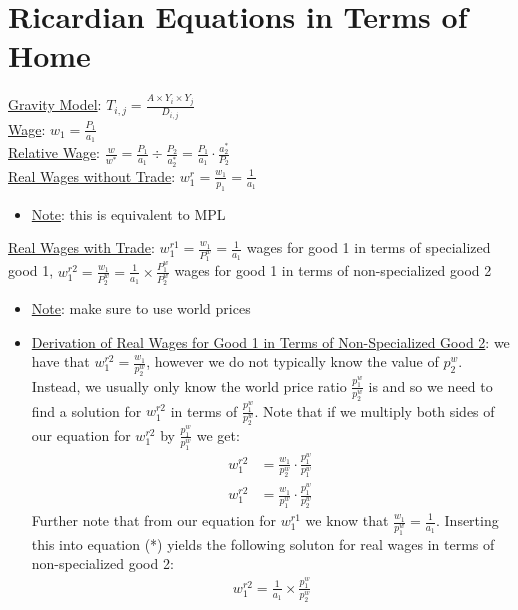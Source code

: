 \documentclass{article}
\begin{document}
\section{Ricardian Equations in Terms of Home}
\underline{Gravity Model}: $T_{i,j} = \frac{A \times Y_{i} \times Y_{j}}{D_{i,j}}$ \\
\underline{Wage}: $w_{1} = \frac{P_{1}}{a_{1}}$ \\
\underline{Relative Wage}: $\frac{w}{w^{*}} = \frac{P_{1}}{a_{1}} \div \frac{P_{2}}{a_{2}^{*}} = \frac{P_{1}}{a_{1}} \cdot  \frac{a_{2}^{*}}{P_{2}}$ \\
\underline{Real Wages without Trade}: $w_{1}^{r} = \frac{w_{1}}{p_{1}} = \frac{1}{a_{1}}$
\begin{itemize}
  \item  \underline{Note}: this is equivalent to MPL
\end{itemize}
\underline{Real Wages with Trade}: $w_{1}^{r1} = \frac{w_{1}}{P_{1}^{w}} = \frac{1}{a_{1}}$ wages for good 1 in terms of specialized good 1, $w_{1}^{r2} = \frac{w_{1}}{P_{2}^{w}} = \frac{1}{a_{1}} \times \frac{P_{1}^{w}}{P_{2}^{w}}$ wages for good 1 in terms of non-specialized good 2
\begin{itemize}
  \item  \underline{Note}: make sure to use world prices
  \item  \underline{Derivation of Real Wages for Good 1 in Terms of Non-Specialized Good 2}: we have that $w_{1}^{r2} = \tfrac{w_{1}}{p_{2}^{w}}$, however we do not typically know the value of $p_{2}^{w}$. Instead, we usually only know the world price ratio $\tfrac{p_{1}^{w}}{p_{2}^{w}}$ is and so we need to find a solution for $w_{1}^{r2}$ in terms of $\tfrac{p_{1}^{w}}{p_{2}^{w}}$. Note that if we multiply both sides of our equation for $w_{1}^{r2}$ by $\tfrac{p_{1}^{w}}{p_{1}^{w}}$ we get:
  \begin{align*}
    w_{1}^{r2} &= \frac{w_{1}}{p_{2}^{w}} \cdot \frac{p_{1}^{w}}{p_{1}^{w}} \\
    w_{1}^{r2} &= \frac{w_{1}}{p_{1}^{w}} \cdot \frac{p_{1}^{w}}{p_{2}^{w}} \ \tag{*}
  \end{align*}
  Further note that from our equation for $w_{1}^{r1}$ we know that $\tfrac{w_{1}}{p_{1}^{w}} = \tfrac{1}{a_{1}}$. Inserting this into equation (*) yields the following soluton for real wages in terms of non-specialized good 2:
  \begin{gather*}
    w_{1}^{r2} = \frac{1}{a_{1}} \times \frac{p_{1}^{w}}{p_{2}^{w}}
  \end{gather*}
\end{itemize}
\end{document}
